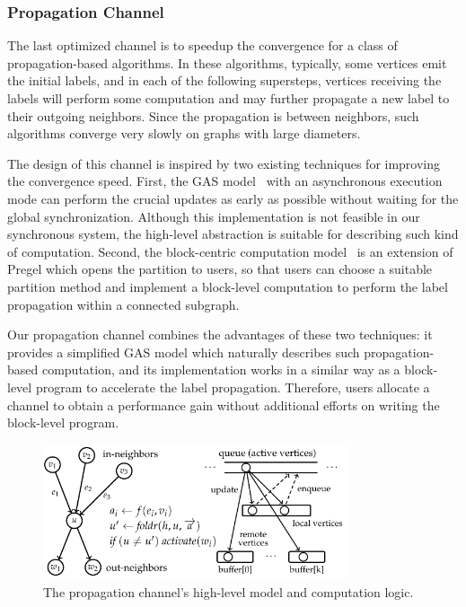 \documentclass{sokendai_thesis} %
\begin{document}
\subsubsection{Propagation Channel}
\label{sec:propagation}

The last optimized channel is to speedup the convergence for a class of propagation-based algorithms.
In these algorithms, typically, some vertices emit the initial labels, and in each of the following supersteps, vertices receiving the labels will perform some computation and may further propagate a new label to their outgoing neighbors.
Since the propagation is between neighbors, such algorithms converge very slowly on graphs with large diameters.

The design of this channel is inspired by two existing techniques for improving the convergence speed.
First, the GAS model~\cite{powergraph} with an asynchronous execution mode can perform the crucial updates as early as possible without waiting for the global synchronization.
Although this implementation is not feasible in our synchronous system, the high-level abstraction is suitable for describing such kind of computation.
Second, the block-centric computation model~\cite{thinkgraph,yan2014blogel,goffish} is an extension of Pregel which opens the partition to users, so that users can choose a suitable partition method and implement a block-level computation to perform the label propagation within a connected subgraph.

Our propagation channel combines the advantages of these two techniques: it provides a simplified GAS model which naturally describes such propagation-based computation, and its implementation works in a similar way as a block-level program to accelerate the label propagation.
Therefore, users allocate a channel to obtain a performance gain without additional efforts on writing the block-level program.

\begin{figure}[t]
\centering
\includegraphics[width=0.8\textwidth]{figures/async-model.pdf}
\caption{The propagation channel's high-level model and computation logic.}
\label{fig:propagation-model}
\end{figure}
\end{document}
